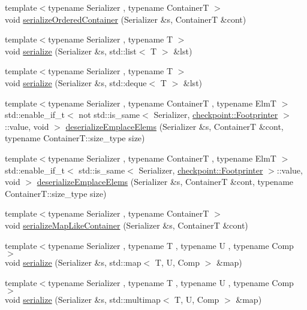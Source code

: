 \begin{DoxyCompactItemize}
\item 
{\footnotesize template$<$typename Serializer , typename ContainerT $>$ }\\void \hyperlink{namespacecheckpoint_a0b15edc50a881e06260e7112b2c60742}{serialize\+Ordered\+Container} (Serializer \&s, ContainerT \&cont)
\item 
{\footnotesize template$<$typename Serializer , typename T $>$ }\\void \hyperlink{namespacecheckpoint_afb32627049eb840e4f8b9fd3022f2eb2}{serialize} (Serializer \&s, std\+::list$<$ T $>$ \&lst)
\item 
{\footnotesize template$<$typename Serializer , typename T $>$ }\\void \hyperlink{namespacecheckpoint_a179b767294c9b23617f30fc4566d0be7}{serialize} (Serializer \&s, std\+::deque$<$ T $>$ \&lst)
\item 
{\footnotesize template$<$typename Serializer , typename ContainerT , typename ElmT $>$ }\\std\+::enable\+\_\+if\+\_\+t$<$ not std\+::is\+\_\+same$<$ Serializer, \hyperlink{structcheckpoint_1_1_footprinter}{checkpoint\+::\+Footprinter} $>$\+::value, void $>$ \hyperlink{namespacecheckpoint_a9016e0756f91e6e982b3c824c007c251}{deserialize\+Emplace\+Elems} (Serializer \&s, ContainerT \&cont, typename Container\+T\+::size\+\_\+type size)
\item 
{\footnotesize template$<$typename Serializer , typename ContainerT , typename ElmT $>$ }\\std\+::enable\+\_\+if\+\_\+t$<$ std\+::is\+\_\+same$<$ Serializer, \hyperlink{structcheckpoint_1_1_footprinter}{checkpoint\+::\+Footprinter} $>$\+::value, void $>$ \hyperlink{namespacecheckpoint_a811956d461a3ebc7329272fd33e1084f}{deserialize\+Emplace\+Elems} (Serializer \&s, ContainerT \&cont, typename Container\+T\+::size\+\_\+type size)
\item 
{\footnotesize template$<$typename Serializer , typename ContainerT $>$ }\\void \hyperlink{namespacecheckpoint_a99092baac18b33d03b1bb47ed1f2d7fa}{serialize\+Map\+Like\+Container} (Serializer \&s, ContainerT \&cont)
\item 
{\footnotesize template$<$typename Serializer , typename T , typename U , typename Comp $>$ }\\void \hyperlink{namespacecheckpoint_a39ee0888319dc204dff7af20dd1e8238}{serialize} (Serializer \&s, std\+::map$<$ T, U, Comp $>$ \&map)
\item 
{\footnotesize template$<$typename Serializer , typename T , typename U , typename Comp $>$ }\\void \hyperlink{namespacecheckpoint_a44434f578fc304afa3a62a9305be2a65}{serialize} (Serializer \&s, std\+::multimap$<$ T, U, Comp $>$ \&map)

\end{DoxyCompactItemize}
